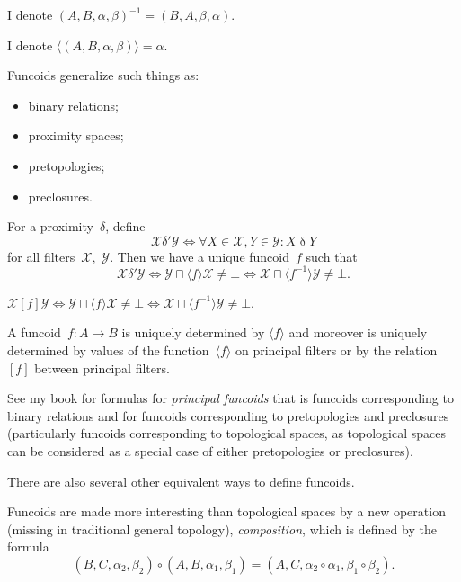 \documentclass{amsart}
\begin{document}
\begin{defn}
I denote $(A,B,\alpha,\beta)^{-1} = (B,A,\beta,\alpha)$.
\end{defn}

\begin{defn}
I denote $\langle(A,B,\alpha,\beta)\rangle = \alpha$.
\end{defn}

Funcoids generalize such things as:
\begin{itemize}
\item binary relations;
\item proximity spaces;
\item pretopologies;
\item preclosures.
\end{itemize}

For a proximity~$\delta$, define
\[ \mathcal{X}\mathrel{\delta'}\mathcal{Y} \Leftrightarrow \forall X\in\mathcal{X},Y\in\mathcal{Y}: X\mathrel{\delta}Y \]
for all filters~$\mathcal{X}$,~$\mathcal{Y}$.
Then we have a unique funcoid~$f$ such that
\[
\mathcal{X}\mathrel{\delta'}\mathcal{Y} \Leftrightarrow
\mathcal{Y}\sqcap\langle f\rangle\mathcal{X} \ne \bot \Leftrightarrow
\mathcal{X}\sqcap\langle f^{-1}\rangle\mathcal{Y} \ne \bot.
\]

\begin{defn}
$\mathcal{X} \mathrel{[f]} \mathcal{Y} \Leftrightarrow \mathcal{Y}\sqcap\langle f\rangle\mathcal{X} \ne \bot \Leftrightarrow
\mathcal{X}\sqcap\langle f^{-1}\rangle\mathcal{Y} \ne \bot$.
\end{defn}

\begin{prop}
A funcoid~$f: A\rightarrow B$ is uniquely determined by $\langle f\rangle$ and moreover is uniquely
determined by values of the function~$\langle f\rangle$ on principal filters or
by the relation~$[f]$ between principal filters.
\end{prop}

See my book for formulas for \emph{principal funcoids} that is funcoids corresponding to binary relations
and for funcoids corresponding to pretopologies and preclosures (particularly funcoids corresponding to
topological spaces, as topological spaces can be considered as a special case of either pretopologies or preclosures).

There are also several other equivalent ways to define funcoids.

Funcoids are made more interesting than topological spaces by a new operation (missing in traditional general topology),
\emph{composition}, which is defined by the formula
\[ (B,C,\alpha_2,\beta_2)\circ (A,B,\alpha_1,\beta_1) = (A,C,\alpha_2\circ\alpha_1,\beta_1\circ\beta_2). \]
\end{document}
